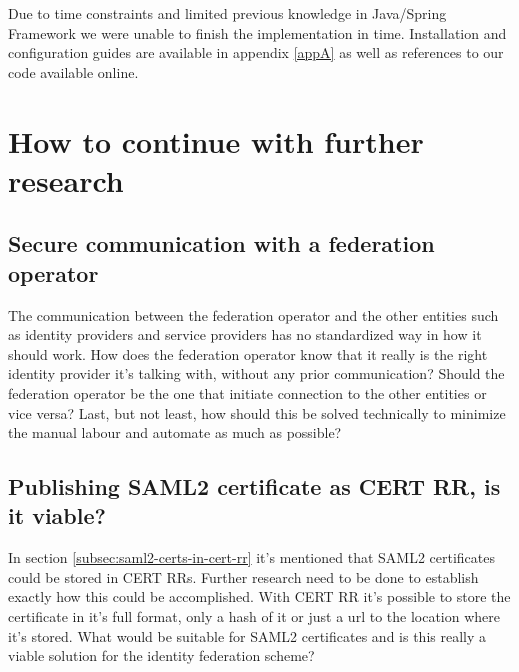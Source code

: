 Due to time constraints and limited previous knowledge in Java/Spring Framework we were unable to finish the implementation in time.
Installation and configuration guides are available in appendix \ref{appA} as well as references to our code available online.





\section{How to continue with further research}
\subsection{Secure communication with a federation operator}
The communication between the federation operator and the other entities such as identity providers and service providers has no standardized way in how it should work.
How does the federation operator know that it really is the right identity provider it's talking with, without any prior communication?
Should the federation operator be the one that initiate connection to the other entities or vice versa?
Last, but not least, how should this be solved technically to minimize the manual labour and automate as much as possible?

\subsection{Publishing SAML2 certificate as CERT RR, is it viable?}
In section \ref{subsec:saml2-certs-in-cert-rr} it's mentioned that SAML2 certificates could be stored in CERT RRs.
Further research need to be done to establish exactly how this could be accomplished.
With CERT RR it's possible to store the certificate in it's full format, only a hash of it or just a url to the location where it's stored\cite[ch. 2.1]{rfc:4398}.
What would be suitable for SAML2 certificates and is this really a viable solution for the identity federation scheme?

